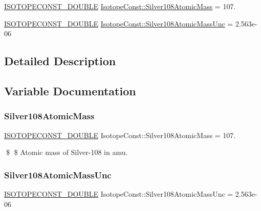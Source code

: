 \begin{DoxyCompactItemize}
\item 
\mbox{\hyperlink{group___isotope_const-_macros_ga8f45a7272ce02c0b4c65c44636ed719a}{I\+S\+O\+T\+O\+P\+E\+C\+O\+N\+S\+T\+\_\+\+D\+O\+U\+B\+LE}} \mbox{\hyperlink{group___isotope_const-_silver-_ag108_gaf8676903a616b84452ab6e716f9bd149}{Isotope\+Const\+::\+Silver108\+Atomic\+Mass}} = 107.
\item 
\mbox{\hyperlink{group___isotope_const-_macros_ga8f45a7272ce02c0b4c65c44636ed719a}{I\+S\+O\+T\+O\+P\+E\+C\+O\+N\+S\+T\+\_\+\+D\+O\+U\+B\+LE}} \mbox{\hyperlink{group___isotope_const-_silver-_ag108_gacfcabc3d4356afb79d8aa226cb71ab23}{Isotope\+Const\+::\+Silver108\+Atomic\+Mass\+Unc}} = 2.\+563e-\/06
\end{DoxyCompactItemize}


\subsection{Detailed Description}


\subsection{Variable Documentation}
\mbox{\label{group___isotope_const-_silver-_ag108_gaf8676903a616b84452ab6e716f9bd149}} 
\subsubsection{\texorpdfstring{Silver108\+Atomic\+Mass}{Silver108AtomicMass}}
{\footnotesize\ttfamily \mbox{\hyperlink{group___isotope_const-_macros_ga8f45a7272ce02c0b4c65c44636ed719a}{I\+S\+O\+T\+O\+P\+E\+C\+O\+N\+S\+T\+\_\+\+D\+O\+U\+B\+LE}} Isotope\+Const\+::\+Silver108\+Atomic\+Mass = 107.}

\$ \$ Atomic mass of Silver-\/108 in amu. \mbox{\label{group___isotope_const-_silver-_ag108_gacfcabc3d4356afb79d8aa226cb71ab23}} 
\subsubsection{\texorpdfstring{Silver108\+Atomic\+Mass\+Unc}{Silver108AtomicMassUnc}}
{\footnotesize\ttfamily \mbox{\hyperlink{group___isotope_const-_macros_ga8f45a7272ce02c0b4c65c44636ed719a}{I\+S\+O\+T\+O\+P\+E\+C\+O\+N\+S\+T\+\_\+\+D\+O\+U\+B\+LE}} Isotope\+Const\+::\+Silver108\+Atomic\+Mass\+Unc = 2.\+563e-\/06}

